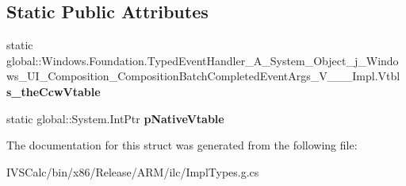 \subsection*{Static Public Attributes}
\begin{DoxyCompactItemize}
\item 
\mbox{\label{struct_windows_1_1_foundation_1_1_typed_event_handler___a___system___object__j___windows___u_i__c6631eed6bac8896fe4382b061b4296d_afdd5da9cff46fcf25f3d44666f8607a8}} 
static global\+::\+Windows.\+Foundation.\+Typed\+Event\+Handler\+\_\+\+A\+\_\+\+System\+\_\+\+Object\+\_\+j\+\_\+\+Windows\+\_\+\+U\+I\+\_\+\+Composition\+\_\+\+Composition\+Batch\+Completed\+Event\+Args\+\_\+\+V\+\_\+\+\_\+\+\_\+\+Impl.\+Vtbl {\bfseries s\+\_\+the\+Ccw\+Vtable}
\item 
\mbox{\label{struct_windows_1_1_foundation_1_1_typed_event_handler___a___system___object__j___windows___u_i__c6631eed6bac8896fe4382b061b4296d_a832bb6e6150698b5dcb795b16e504cd8}} 
static global\+::\+System.\+Int\+Ptr {\bfseries p\+Native\+Vtable}
\end{DoxyCompactItemize}


The documentation for this struct was generated from the following file\+:\begin{DoxyCompactItemize}
\item 
I\+V\+S\+Calc/bin/x86/\+Release/\+A\+R\+M/ilc/Impl\+Types.\+g.\+cs\end{DoxyCompactItemize}
